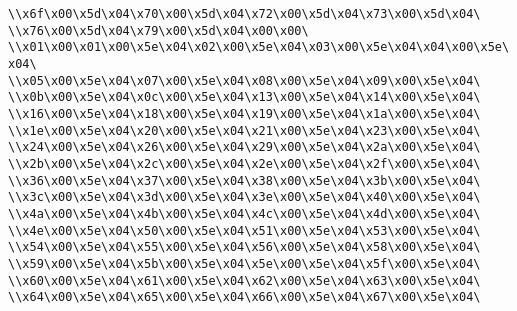 \verb|\\x6f\x00\x5d\x04\x70\x00\x5d\x04\x72\x00\x5d\x04\x73\x00\x5d\x04\|\newline
\verb|\\x76\x00\x5d\x04\x79\x00\x5d\x04\x00\x00\|\newline
\verb|\\x01\x00\x01\x00\x5e\x04\x02\x00\x5e\x04\x03\x00\x5e\x04\x04\x00\x5e\x04\|\newline
\verb|\\x05\x00\x5e\x04\x07\x00\x5e\x04\x08\x00\x5e\x04\x09\x00\x5e\x04\|\newline
\verb|\\x0b\x00\x5e\x04\x0c\x00\x5e\x04\x13\x00\x5e\x04\x14\x00\x5e\x04\|\newline
\verb|\\x16\x00\x5e\x04\x18\x00\x5e\x04\x19\x00\x5e\x04\x1a\x00\x5e\x04\|\newline
\verb|\\x1e\x00\x5e\x04\x20\x00\x5e\x04\x21\x00\x5e\x04\x23\x00\x5e\x04\|\newline
\verb|\\x24\x00\x5e\x04\x26\x00\x5e\x04\x29\x00\x5e\x04\x2a\x00\x5e\x04\|\newline
\verb|\\x2b\x00\x5e\x04\x2c\x00\x5e\x04\x2e\x00\x5e\x04\x2f\x00\x5e\x04\|\newline
\verb|\\x36\x00\x5e\x04\x37\x00\x5e\x04\x38\x00\x5e\x04\x3b\x00\x5e\x04\|\newline
\verb|\\x3c\x00\x5e\x04\x3d\x00\x5e\x04\x3e\x00\x5e\x04\x40\x00\x5e\x04\|\newline
\verb|\\x4a\x00\x5e\x04\x4b\x00\x5e\x04\x4c\x00\x5e\x04\x4d\x00\x5e\x04\|\newline
\verb|\\x4e\x00\x5e\x04\x50\x00\x5e\x04\x51\x00\x5e\x04\x53\x00\x5e\x04\|\newline
\verb|\\x54\x00\x5e\x04\x55\x00\x5e\x04\x56\x00\x5e\x04\x58\x00\x5e\x04\|\newline
\verb|\\x59\x00\x5e\x04\x5b\x00\x5e\x04\x5e\x00\x5e\x04\x5f\x00\x5e\x04\|\newline
\verb|\\x60\x00\x5e\x04\x61\x00\x5e\x04\x62\x00\x5e\x04\x63\x00\x5e\x04\|\newline
\verb|\\x64\x00\x5e\x04\x65\x00\x5e\x04\x66\x00\x5e\x04\x67\x00\x5e\x04\|\newline
